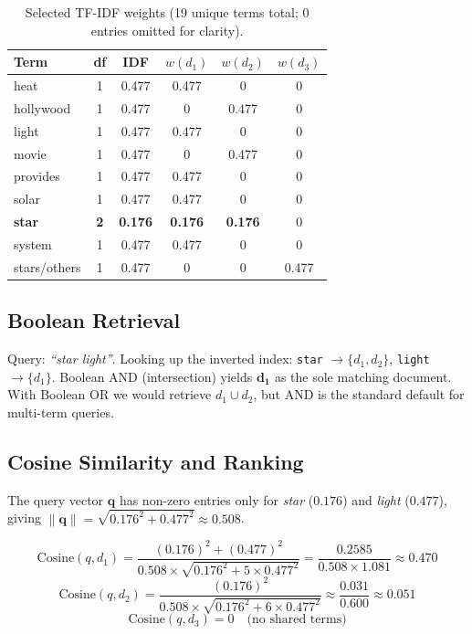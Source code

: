 \documentclass{article}
\begin{document}
\begin{table}[H]
\centering
\renewcommand{\arraystretch}{1.2}
\begin{tabular}{lccccc}
\toprule
\textbf{Term} & \textbf{df} & \textbf{IDF} & $w(d_1)$ & $w(d_2)$ & $w(d_3)$ \\
\midrule
heat       & 1 & 0.477 & 0.477 & 0     & 0     \\
hollywood  & 1 & 0.477 & 0     & 0.477 & 0     \\
light      & 1 & 0.477 & 0.477 & 0     & 0     \\
movie      & 1 & 0.477 & 0     & 0.477 & 0     \\
provides   & 1 & 0.477 & 0.477 & 0     & 0     \\
solar      & 1 & 0.477 & 0.477 & 0     & 0     \\
\textbf{star} & \textbf{2} & \textbf{0.176} & \textbf{0.176} & \textbf{0.176} & 0 \\
system     & 1 & 0.477 & 0.477 & 0     & 0     \\
stars/others & 1 & 0.477 & 0 & 0 & 0.477 \\
\bottomrule
\end{tabular}
\caption{Selected TF-IDF weights (19 unique terms total; 0 entries omitted for clarity).}
\end{table}

\subsection{Boolean Retrieval}

Query: \textit{``star light''}. Looking up the inverted index: \texttt{star} $\to \{d_1, d_2\}$, \texttt{light} $\to \{d_1\}$. Boolean AND (intersection) yields $\mathbf{d_1}$ as the sole matching document. With Boolean OR we would retrieve $d_1 \cup d_2$, but AND is the standard default for multi-term queries.

\subsection{Cosine Similarity and Ranking}

The query vector $\mathbf{q}$ has non-zero entries only for \textit{star} ($0.176$) and \textit{light} ($0.477$), giving $\|\mathbf{q}\| = \sqrt{0.176^2 + 0.477^2} \approx 0.508$.

\[
\mathrm{Cosine}(q, d_1) = \frac{(0.176)^2 + (0.477)^2}{0.508 \times \sqrt{0.176^2 + 5 \times 0.477^2}} = \frac{0.2585}{0.508 \times 1.081} \approx \mathbf{0.470}
\]
\[
\mathrm{Cosine}(q, d_2) = \frac{(0.176)^2}{0.508 \times \sqrt{0.176^2 + 6 \times 0.477^2}} \approx \frac{0.031}{0.600} \approx \mathbf{0.051}
\]
\[
\mathrm{Cosine}(q, d_3) = 0 \quad \text{(no shared terms)}
\]
\end{document}

